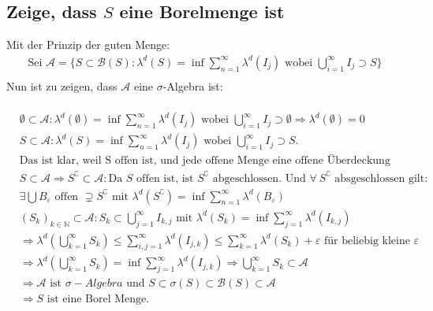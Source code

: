 \documentclass[12pt,a4paper]{article}
\begin{document}
\subsection{Zeige, dass $S$ eine Borelmenge ist}
Mit der Prinzip der guten Menge:
\begin{align*}
\text{Sei }	\mathscr{A} = \{ S \subset \mathscr{B}(S): \lambda^d(S) = \inf \sum_{n=1}^{\infty} \lambda^d(I_j) \text{ wobei } \bigcup_{i=1}^{\infty}I_j \supset S\}\\
\end{align*}
Nun ist zu zeigen, dass $\mathscr{A}$ eine $\sigma$-Algebra ist:\\\\
\begin{align*}
&\emptyset \subset \mathscr{A} : \lambda^d(\emptyset) = \inf \sum_{n=1}^{\infty} \lambda^d(I_j) \text{ wobei } \bigcup_{i=1}^{\infty}I_j \supset \emptyset \Rightarrow \lambda^d(\emptyset) = 0	\\
&S\subset \mathscr{A}: \lambda^d(S) = \inf \sum_{n=1}^{\infty} \lambda^d(I_j) \text{ wobei }\bigcup_{i=1}^{\infty}I_j \supset S.\\
&\text{Das ist klar, weil S offen ist, und jede offene Menge eine offene Überdeckung hat.}\\
&S \subset \mathscr{A} \Rightarrow S^\complement \subset \mathscr{A}: \text{Da   } S \text{ offen ist, ist }S^\complement \text{ abgeschlossen. Und } \forall  \ S^\complement \text{ absgeschlossen gilt: } \\
&\exists \bigcup B_\varepsilon\text{ offen } \supsetneq S^\complement \text{ mit } \lambda^d(S^\complement) =\inf \sum_{n=1}^{\infty} \lambda^d(B_\varepsilon)\\
&(S_k)_{k \in \mathbb{N}} \subset \mathscr{A}: S_k \subset \bigcup_{j=1}^\infty I_{k,j} \text{ mit }\lambda^d(S_k) = \inf \sum_{j=1}^{\infty}\lambda^d(I_{k,j})\\
&\Rightarrow \lambda^d(\bigcup_{k=1}^{\infty}S_k) \leq \sum_{i, j=1}^{\infty} \lambda^d(I_{j,k})\leq \sum_{k=1}^{\infty} \lambda^d(S_k) + \varepsilon \text{ für beliebig kleine }\varepsilon\\
&\Rightarrow \lambda^d(\bigcup_{k=1}^{\infty}S_k) = \inf\sum_{j=1}^{\infty} \lambda^d(I_{j,k}) \Rightarrow \bigcup_{k=1}^{\infty}S_k \subset \mathscr{A}\\
&\Rightarrow \mathscr{A} \text{ ist }\sigma-Algebra\text{ und }S \subset \sigma(S) \subset \mathscr{B}(S) \subset \mathscr{A}\\ 
&\Rightarrow S \text{ ist eine Borel Menge.}\\
\end{align*}
\end{document}
